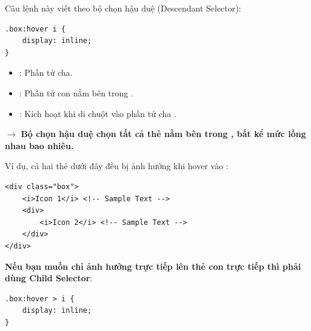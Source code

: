 \begin{conceptBox}
Câu lệnh này viết theo bộ chọn hậu duệ (Descendant Selector):
\begin{codeWindow}
\begin{lstlisting}[language=CSS3]
.box:hover i {
    display: inline;
}
\end{lstlisting}
\end{codeWindow}
\begin{itemize}[leftmargin=1.5em, itemsep=2pt, parsep=0pt]
    \item {}: Phần tử cha.
    \item {}: Phần tử con nằm bên trong .
    \item {}: Kích hoạt khi di chuột vào phần tử cha .
\end{itemize}
$\rightarrow$ \textbf{Bộ chọn hậu duệ chọn tất cả thẻ  nằm bên trong , bất kể mức lồng nhau bao nhiêu.}

Ví dụ, cả hai thẻ  dưới đây đều bị ảnh hưởng khi hover vào :
\begin{codeWindow}
\begin{lstlisting}[language=HTML5]
<div class="box">
    <i>Icon 1</i> <!-- Sample Text -->
    <div>
        <i>Icon 2</i> <!-- Sample Text -->
    </div>
</div>
\end{lstlisting}
\end{codeWindow}

\textbf{Nếu bạn muốn chỉ ảnh hưởng trực tiếp lên thẻ  con trực tiếp thì phải dùng Child Selector}:
\begin{codeWindow}
\begin{lstlisting}[language=CSS3]
.box:hover > i {
    display: inline;
}
\end{lstlisting}
\end{codeWindow}
\end{conceptBox}

